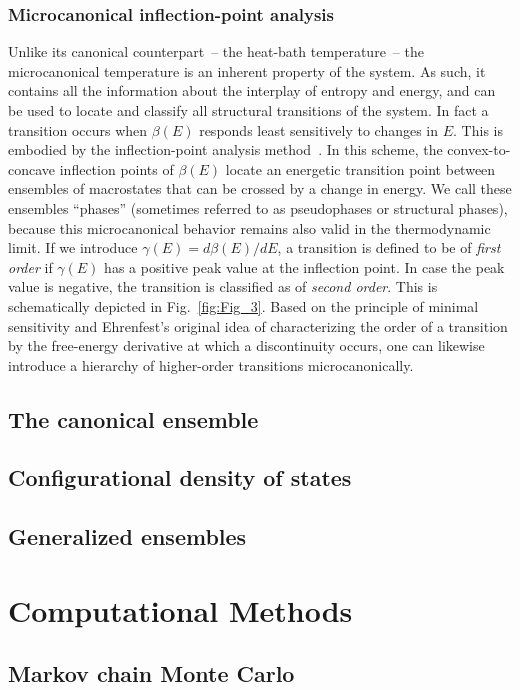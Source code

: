 \documentclass[12pt]{report}
\begin{document}
\subsection{Microcanonical inflection-point analysis}
Unlike its canonical counterpart~-- the heat-bath temperature~-- the
microcanonical temperature is an
inherent property of the system. As such, it contains all the information
about the interplay of entropy and energy, and can be used to locate and
classify all structural transitions of the system. In fact a transition
occurs when $\beta(E)$ responds least sensitively to changes in $E$.
This is embodied by the inflection-point analysis
method~\cite{Bachmann2014,Schnabel2011}. In this scheme, the
convex-to-concave inflection points of $\beta(E)$ locate an energetic
transition point between ensembles of macrostates that can be crossed by a
change in energy. We call these ensembles ``phases'' (sometimes referred
to as pseudophases or structural phases), because this microcanonical
behavior remains also valid in the thermodynamic limit. If we introduce
$\gamma(E)=d\beta(E)/dE$, a transition is defined to
be of \textit{first order} if $\gamma(E)$ has a positive peak value
at the inflection point. In case the peak value is negative, the
transition is
classified as of \textit{second order}. This is schematically depicted in
Fig.~\ref{fig:Fig_3}. Based on the principle of minimal
sensitivity and Ehrenfest's original idea of characterizing the order of a
transition by the free-energy derivative at which a discontinuity occurs,
one can likewise introduce a hierarchy of higher-order transitions
microcanonically.

\section{The canonical ensemble}
\section{Configurational density of states}
\section{Generalized ensembles}

\chapter{Computational Methods}
\section{Markov chain Monte Carlo}
\end{document}
